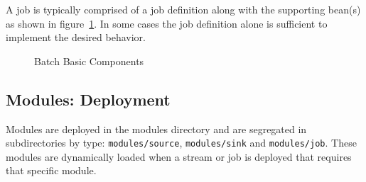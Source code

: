 \par

A job is typically comprised of a job definition along with the supporting
bean(s) as shown in figure~\ref{fig:batchmbc}.
In some cases the job definition alone is sufficient to implement the desired behavior.

\par

\begin{figure}
\centering
{}
\caption{Batch Basic Components}
\label{fig:batchmbc}
\end{figure}

\subsection{Modules: Deployment}
Modules are deployed in the modules directory and are segregated in
subdirectories by type: \texttt{modules/source}, \texttt{modules/sink} and \texttt{modules/job}.
These modules are dynamically loaded when a stream or job is deployed that requires that
specific module.

\par
